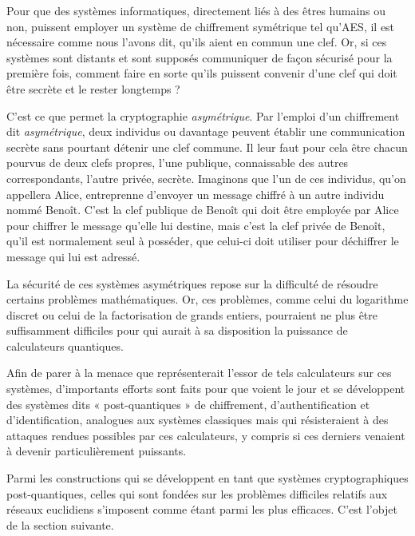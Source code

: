 Pour que des systèmes informatiques, directement liés à des êtres humains ou non, puissent
employer un système de chiffrement symétrique tel qu’AES, il est nécessaire comme nous l’avons dit,
qu’ils aient en commun une clef.
Or, si ces systèmes sont distants et sont supposés communiquer de façon sécurisé pour la première
fois, comment faire en sorte qu’ils puissent convenir d’une clef qui doit être secrète et le rester
longtemps ?\par
C’est ce que permet la cryptographie \emph{asymétrique}.
Par l’emploi d’un chiffrement dit \emph{asymétrique}, deux individus ou davantage peuvent établir une communication secrète sans pourtant détenir une clef commune.
Il leur faut pour cela être chacun pourvus de deux clefs propres, l’une publique, connaissable des autres correspondants, l’autre privée, secrète. 
Imaginons que l’un de ces individus, qu’on appellera Alice, entreprenne d’envoyer un message chiffré à un autre individu nommé Benoît. C’est la clef publique de Benoît qui doit être employée par Alice pour chiffrer le message qu’elle lui destine, mais c’est la clef privée de Benoît, qu’il est normalement seul à posséder, que celui-ci doit utiliser pour déchiffrer le message qui lui est adressé.\par
La sécurité de ces systèmes asymétriques repose sur la difficulté de résoudre certains problèmes mathématiques.
Or, ces problèmes, comme celui du logarithme discret ou celui de la factorisation de
grands entiers, pourraient ne plus être suffisamment difficiles pour qui aurait à sa disposition la puissance de calculateurs quantiques.\par
Afin de parer à la menace que représenterait l’essor de tels calculateurs sur ces systèmes, d’importants efforts sont faits pour que voient le jour et se développent des
systèmes dits « post-quantiques » de chiffrement, d’authentification et d’identification, analogues aux systèmes classiques
mais qui résisteraient à des attaques rendues possibles par ces calculateurs, y compris si ces derniers venaient à devenir particulièrement puissants.\par
Parmi les constructions qui se développent en tant que systèmes cryptographiques post-quantiques, celles qui sont fondées sur les problèmes difficiles relatifs aux réseaux euclidiens s’imposent comme étant parmi les plus efficaces. C’est l’objet de la section suivante.



